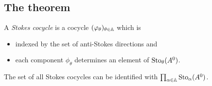 \subsection{The theorem}
\begin{comment}
  \cite[Thm.6.3.1]{sibuya1990Linear} says: if two differential equations have
  the same stokes phenomenon, they are analytically equivalent.
\end{comment}
\begin{defn}

  A \emph{Stokes cocycle} is a cocycle
  $(\varphi_\theta)_{\theta\in\mathbb{A}}$ which is
  \begin{itemize}
    \item indexed by the set of anti-Stokes directions and
    \item each component $\phi_\theta$ determines an element of
      $\operatorname{Sto}_\theta(A^0)$.
  \end{itemize}
  \begin{s-rem}
    The set of all Stokes cocycles can be identified with
    $\prod_{\alpha\in\mathbb{A}}\operatorname{Sto}_\alpha(A^0)$.
  \end{s-rem}
\end{defn}


